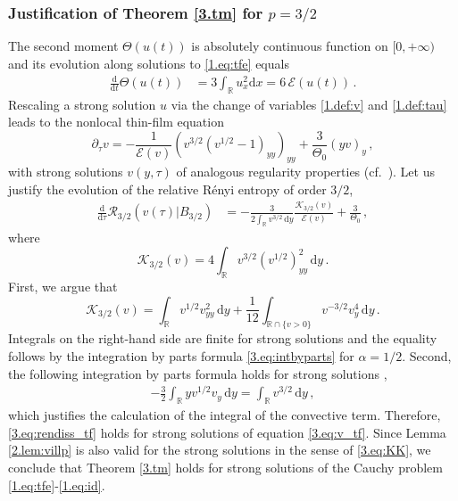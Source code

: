 \documentclass[12pt]{amsart}
\let\pa\partial
\newcommand{\R}{{\mathbb R}}
\newcommand{\K}{{\mathcal K}}
\newcommand{\renyi}{{\mathcal{R}}}
\newcommand{\dd}{{\mathrm{d}}}
\newcommand{\E}{\mathcal{E}}
\newcommand{\M}{\Theta}
\theoremstyle{plain}
\theoremstyle{definition}
\theoremstyle{remark}
\begin{document}
\subsubsection{Justification of Theorem \ref{3.tm} for $p=3/2$}
The second moment $\M(u(t))$ is absolutely continuous function on $[0,+\infty)$ and its evolution along solutions to \eqref{1.eq:tfe} equals 
\begin{align*}
    \frac{\dd }{\dd t}\M(u(t)) &= 
     3\int_\R u_{x}^2\dd x= 6\, \E(u(t))\,.
\end{align*}
Rescaling a strong solution $u$ via the change of variables \eqref{1.def:v} and \eqref{1.def:tau} leads to the nonlocal thin-film equation
\begin{equation}\label{3.eq:v_tf}
        \pa_\tau v = -\frac{1}{\E(v)}\left(v^{3/2}\left(v^{1/2}-1\right)_{yy}\right)_{yy} + \frac{3}{\M_0}(y v)_y\,,
    \end{equation}
with strong solutions $v(y,\tau)$ of analogous regularity properties (cf.~\cite{CaTo02}).  
Let us justify the evolution of the relative R\'enyi entropy of order $3/2$,
\begin{align}\label{3.eq:rendiss_tf}
    \frac{\dd}{\dd \tau}\renyi_{3/2}(v(\tau)|B_{3/2}) &=  -\frac{3}{2\int_\R v^{3/2}\, \dd y} \frac{\K_{3/2}(v)}{\E(v)}  + \frac{3}{\M_0}\,,
\end{align}
where
\begin{equation*}
    \K_{3/2}(v) = 4\int_\R v^{3/2}\left(v^{1/2}\right)_{yy}^2\, \dd y\,.
\end{equation*}
First, we argue that
\begin{equation}\label{3.eq:KK}
    \K_{3/2}(v) = \int_{\R}v^{1/2}v_{yy}^2\, \dd y + \frac{1}{12}\int_{\R\cap\{v>0\}}v^{-3/2}v_y^4\, \dd y\,.
\end{equation}
Integrals on the right-hand side are finite for strong solutions and the equality follows by the integration by parts formula \eqref{3.eq:intbyparts} for $\alpha=1/2$. Second, the following integration by parts formula holds for strong solutions \cite{CaTo02},
\begin{align*}
    -\frac{3}{2} \int_\R y v^{1/2}v_y \,\dd y
    = \int_\R v^{3/2}\,\dd y\,,
\end{align*}
which justifies the calculation of the integral of the convective term.
Therefore, \eqref{3.eq:rendiss_tf} holds for strong solutions of equation \eqref{3.eq:v_tf}. Since Lemma \ref{2.lem:villp} is also valid for the strong solutions in the sense of \eqref{3.eq:KK}, we conclude that Theorem \eqref{3.tm} holds for strong solutions of the Cauchy problem \eqref{1.eq:tfe}-\eqref{1.eq:id}.
\end{document}
